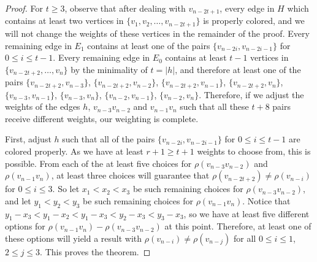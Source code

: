 \documentclass[reqno,12pt,epsf]{amsart}
\def\om{\omm}
\def\omm{\rho}
\begin{document}
\begin{proof}
For $t\ge 3$, observe that after dealing with $v_{n-2t+1}$, every edge in $H$ which contains at least two vertices in $\{v_1,v_2,\ldots,v_{n-2t+1}\}$ is properly colored, and we will not change the weights of these vertices in the remainder of the proof. Every remaining edge in $E_1$ contains at least one of the pairs $\{v_{n-2i},v_{n-2i-1}\}$ for $0\le i\le t-1$. Every remaining edge in $E_0$ contains at least $t-1$ vertices in $\{v_{n-2t+2},\ldots,v_n\}$ by the minimality of $t=|h|$, and therefore at least one of the pairs $\{v_{n-2t+2},v_{n-3}\}$, $\{v_{n-2t+2},v_{n-2}\}$,  $\{v_{n-2t+2},v_{n-1}\}$, $\{v_{n-2t+2},v_{n}\}$, $\{v_{n-3},v_{n-1}\}$, $\{v_{n-3},v_{n}\}$, $\{v_{n-2},v_{n-1}\}$,  $\{v_{n-2},v_{n}\}$. Therefore, if we adjust the weights of the edges $h$, $v_{n-3}v_{n-2}$ and $v_{n-1}v_n$ such that all these $t+8$ pairs receive different weights, our weighting is complete.

First, adjust $h$ such that all of the pairs $\{v_{n-2i},v_{n-2i-1}\}$ for $0\le i\le t-1$ are colored properly. As we have at least $r+1\ge t+1$ weights to choose from, this is possible. 
From each of the at least five choices for  $\om(v_{n-3}v_{n-2})$ and $\om(v_{n-1}v_{n})$, at least three choices will guarantee that $\om(v_{n-2t+2})\ne \om(v_{n-i})$ for $0\le i\le 3$. So let $x_1<x_2<x_3$ be such remaining choices for $\om(v_{n-3}v_{n-2})$, and let $y_1<y_2<y_3$ be such remaining choices for $\om(v_{n-1}v_{n})$.
Notice that $y_1-x_3<y_1-x_2<y_1-x_3<y_2-x_3<y_3-x_3$, so we have at least five different options for $\om(v_{n-1}v_{n})-\om(v_{n-3}v_{n-2})$ at this point. Therefore, at least one of these options will yield a result with $\om(v_{n-i})\ne \om(v_{n-j})$ for all $0\le i\le 1$, $2\le j\le 3$. This proves the theorem.
\end{proof}
\end{document}
